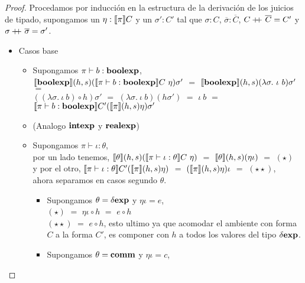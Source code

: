 \begin{proof}
Procedamos por inducci\'on en la estructura de la derivaci\'on de los juicios de tipado,
supongamos un $\eta : \llbracket \pi \rrbracket C$ y un $\sigma' : C'$ tal que $\sigma : C$,
$\overline{\sigma} : \overline{C}$, $C +\kern-1.3ex+\kern0.8ex \overline{C} = C'$ y 
$\sigma +\kern-1.3ex+\kern0.8ex \overline{\sigma} = \sigma'$.

\begin{itemize}

\item Casos base
\begin{itemize}
\item Supongamos $\pi \vdash b : \textbf{boolexp}$, \\

$\llbracket \textbf{boolexp} \rrbracket(h,s)(\llbracket \pi \vdash b : \textbf{boolexp} \rrbracket C \ \eta) \sigma'$ $=$
$\semBrcks{\boolexp}(h,s)(\lambda \sigma. \ \iota \ b) \sigma'$ $=$ \\
$((\lambda \sigma. \ \iota \ b) \circ h)\sigma'$ $=$
$(\lambda \sigma. \ \iota \ b) (h \sigma')$ $=$
$\iota \ b$ $=$ $\llbracket \pi \vdash b : \textbf{boolexp} \rrbracket C'(\llbracket \pi \rrbracket(h,s)\eta)\sigma'$

\item (Analogo $\textbf{intexp}$ y $\textbf{realexp}$)

\item Supongamos $\pi \vdash \iota : \theta$,\\

por un lado tenemos,
$\llbracket \theta \rrbracket(h,s)(\llbracket \pi \vdash \iota : \theta \rrbracket C \ \eta)$ $=$
$\llbracket \theta \rrbracket(h,s)(\eta \iota)$ $=$ $(\star)$ \\

y por el otro, $\llbracket \pi \vdash \iota : \theta \rrbracket C'(\llbracket \pi \rrbracket(h,s)\eta)$ $=$
$(\llbracket \pi \rrbracket(h,s)\eta) \iota$ $=$ $(\star \star)$,\\

ahora separamos en casos segundo $\theta$.

\begin{itemize}
\item Supongamos $\theta = \delta \textbf{exp}$ y $\eta\iota = e$, \\

$(\star)$ $=$ $\eta\iota \circ h$ $=$ $e \circ h$\\

$(\star\star)$ $=$ $e \circ h$, esto ultimo ya que acomodar el ambiente con forma
$C$ a la forma $C'$, es componer con $h$ a todos los valores del tipo $\delta \textbf{exp}$.

\item Supongamos $\theta = \textbf{comm}$ y $\eta\iota = c$,\\


\end{itemize}
\end{itemize}
\end{itemize}
\end{proof}
